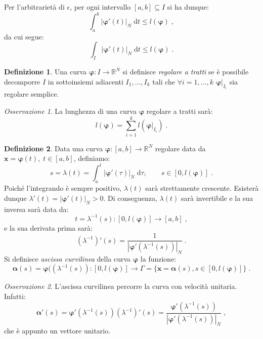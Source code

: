 \documentclass[a4paper,12pt]{report}
\theoremstyle{plain}
\theoremstyle{definition}
\newtheorem{defn}{Definizione}[section]
\theoremstyle{remark}
\newtheorem{oss}{Osservazione}[section]
\newcommand{\diff}[1]{\mathrm{d}#1}
\numberwithin{equation}{section}
\begin{document}
Per l'arbitrarietà di $\epsilon$, per ogni intervallo $[a,b]\subseteq I$ si ha dunque:
\begin{equation}
\int_a^b |\boldsymbol{\varphi}'(t)|_N\;\diff{t}\le l(\boldsymbol{\varphi})\;,
\end{equation}
da cui segue:
\begin{equation}
\int_I |\boldsymbol{\varphi}'(t)|_N\;\diff{t} \le l(\boldsymbol{\varphi})\;.
\end{equation}
\endproof
\begin{defn} Una curva $\boldsymbol{\varphi}:I\to\mathbb{R}^N$ si definisce \textit{regolare a tratti} se è possibile decomporre $I$ in sottoinsiemi adiacenti $I_1,\ldots,I_k$ tali che $\forall i=1,\ldots,k$ $\boldsymbol{\varphi}|_{I_i}$ sia regolare semplice.
\end{defn}
\begin{oss} La lunghezza di una curva $\boldsymbol{\varphi}$ regolare a tratti sarà:
\begin{equation}
l(\boldsymbol{\varphi})=\sum_{i=1}^k l\left(\boldsymbol{\varphi}|_{I_i}\right)\;.
\end{equation}
\end{oss}
\begin{defn} Data una curva $\boldsymbol{\varphi}:[a,b]\to\mathbb{R}^N$ regolare data da $\mathbf{x}=\boldsymbol{\varphi}(t),\;t\in[a,b]$, definiamo:
\begin{equation}
s=\lambda(t)=\int_a^t |\boldsymbol{\varphi}'(\tau)|_N\;\diff{\tau},\qquad s\in[0,l(\boldsymbol{\varphi})]\;.
\end{equation}
Poiché l'integrando è sempre positivo, $\lambda(t)$ sarà strettamente crescente. Esisterà dunque $\lambda'(t)=|\boldsymbol{\varphi}'(t)|
_N>0$. Di conseguenza, $\lambda(t)$ sarà invertibile e la sua inversa sarà data da:
\begin{equation}
t=\lambda^{-1}(s):[0,l(\boldsymbol{\varphi})]\to[a,b]\;,
\end{equation}
e la sua derivata prima sarà:
\begin{equation}
\left(\lambda^{-1}\right)'(s)=\frac{1}{\left|\boldsymbol{\varphi}'(\lambda^{-1}(s))\right|_N}\;.
\end{equation}
Si definisce \textit{ascissa curvilinea} della curva $\boldsymbol{\varphi}$ la funzione:
\begin{equation}
\boldsymbol{\alpha}(s)=\boldsymbol{\varphi}((\lambda^{-1}(s)):[0,l(\boldsymbol{\varphi})]\to\Gamma=\{\mathbf{x}=\boldsymbol{\alpha}(s),s\in[0,l(\boldsymbol{\varphi})]\}\;.
\end{equation}
\end{defn}
\begin{oss} L'ascissa curvilinea percorre la curva con velocità unitaria. Infatti:
\begin{equation}
\boldsymbol{\alpha}'(s)=\boldsymbol{\varphi}'(\lambda^{-1}(s))(\lambda^{-1})'(s)=\frac{\boldsymbol{\varphi}'(\lambda^{-1}(s))}{|
\boldsymbol{\varphi}'(\lambda^{-1}(s))|_N}\;,
\end{equation}
che è appunto un vettore unitario.
\end{oss}
\end{document}
